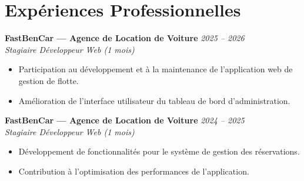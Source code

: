 \documentclass[11pt,a4paper,sans]{article}
\begin{document}
\section*{Expériences Professionnelles}

\textbf{FastBenCar --- Agence de Location de Voiture} \hfill \textit{2025 -- 2026}\\
\textit{Stagiaire Développeur Web (1 mois)}
\begin{itemize}[leftmargin=0.5cm, itemsep=1pt]
    \item Participation au développement et à la maintenance de l'application web de gestion de flotte.
    \item Amélioration de l'interface utilisateur du tableau de bord d'administration.
\end{itemize}

\vspace{4pt}
\textbf{FastBenCar --- Agence de Location de Voiture} \hfill \textit{2024 -- 2025}\\
\textit{Stagiaire Développeur Web (1 mois)}
\begin{itemize}[leftmargin=0.5cm, itemsep=1pt]
    \item Développement de fonctionnalités pour le système de gestion des réservations.
    \item Contribution à l'optimisation des performances de l'application.
\end{itemize}

\end{document}
